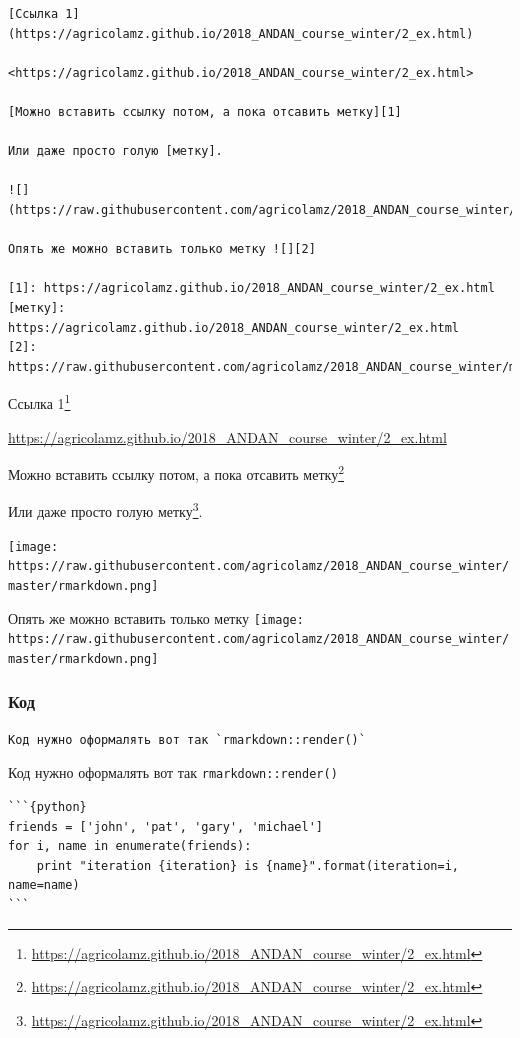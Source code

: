 \documentclass[
]{book}
\renewcommand{\href}[2]{#2\footnote{\url{#1}}}
\begin{document}
\begin{verbatim}
[Ссылка 1](https://agricolamz.github.io/2018_ANDAN_course_winter/2_ex.html)

<https://agricolamz.github.io/2018_ANDAN_course_winter/2_ex.html>

[Можно вставить ссылку потом, а пока отсавить метку][1]

Или даже просто голую [метку].

![](https://raw.githubusercontent.com/agricolamz/2018_ANDAN_course_winter/master/rmarkdown.png)

Опять же можно вставить только метку ![][2]

[1]: https://agricolamz.github.io/2018_ANDAN_course_winter/2_ex.html
[метку]: https://agricolamz.github.io/2018_ANDAN_course_winter/2_ex.html
[2]: https://raw.githubusercontent.com/agricolamz/2018_ANDAN_course_winter/master/rmarkdown.png
\end{verbatim}

\href{https://agricolamz.github.io/2018_ANDAN_course_winter/2_ex.html}{Ссылка 1}

\url{https://agricolamz.github.io/2018_ANDAN_course_winter/2_ex.html}

\href{https://agricolamz.github.io/2018_ANDAN_course_winter/2_ex.html}{Можно вставить ссылку потом, а пока отсавить метку}

Или даже просто голую \href{https://agricolamz.github.io/2018_ANDAN_course_winter/2_ex.html}{метку}.

\texttt{[image: https://raw.githubusercontent.com/agricolamz/2018\_ANDAN\_course\_winter/master/rmarkdown.png]}

Опять же можно вставить только метку \texttt{[image: https://raw.githubusercontent.com/agricolamz/2018\_ANDAN\_course\_winter/master/rmarkdown.png]}

\hypertarget{ux43aux43eux434}{%
\subsubsection{Код}\label{ux43aux43eux434}}

\begin{verbatim}
Код нужно оформалять вот так `rmarkdown::render()`
\end{verbatim}

Код нужно оформалять вот так \texttt{rmarkdown::render()}

\begin{verbatim}
```{python}
friends = ['john', 'pat', 'gary', 'michael']
for i, name in enumerate(friends):
    print "iteration {iteration} is {name}".format(iteration=i, name=name)
```
\end{verbatim}
\end{document}
